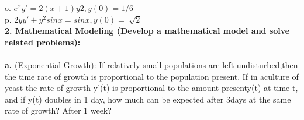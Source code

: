 \documentclass{report}
\begin{document}
o. $e^xy' = 2(x + 1)y2, y(0) = 1/6$\\
p. $2yy' + y^2sin x = sin x, y(0) = \sqrt[]{2}$\\
\solve{

}
\textbf{2. Mathematical Modeling (Develop a mathematical model and solve related problems):}\\\\
\textbf{a.} (Exponential Growth): If relatively small populations are left undisturbed,then the time rate of growth is proportional to the population present. If in aculture of yeast the rate of growth y'(t) is proportional to the amount presenty(t) at time t, and if y(t) doubles in 1 day, how much can be expected after 3days at the same rate of growth? After 1 week?\\
\end{document}
